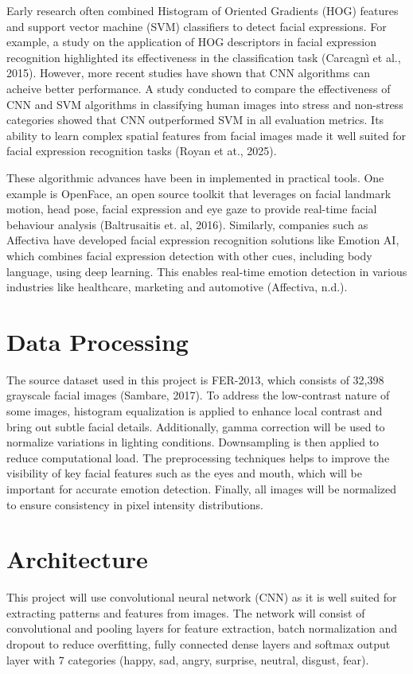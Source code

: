 \documentclass[final]{article}
\begin{document}
Early research often combined Histogram of Oriented Gradients (HOG) features and support vector machine (SVM) classifiers to detect facial expressions. For example, a study on the application of HOG descriptors in facial expression recognition highlighted its effectiveness in the classification task (Carcagnì et al., 2015). However, more recent studies have shown that CNN algorithms can acheive better performance. A study conducted to compare the effectiveness of CNN and SVM algorithms in classifying human images into stress and non-stress categories showed that CNN outperformed SVM in all evaluation metrics. Its ability to learn complex spatial features from facial images made it well suited for facial expression recognition tasks (Royan et at., 2025).

These algorithmic advances have been in implemented in practical tools. One example is OpenFace, an open source toolkit that leverages on facial landmark motion, head pose, facial expression and eye gaze to provide real-time facial behaviour analysis (Baltrusaitis et. al, 2016). Similarly, companies such as Affectiva have developed facial expression recognition solutions like Emotion AI, which combines facial expression detection with other cues, including body language, using deep learning. This enables real-time emotion detection in various industries like healthcare, marketing and automotive (Affectiva, n.d.).


\section*{Data Processing}
The source dataset used in this project is FER-2013, which consists of 32,398 grayscale facial images (Sambare, 2017). To address the low-contrast nature of some images, histogram equalization is applied to enhance local contrast and bring out subtle facial details. Additionally, gamma correction will be used to normalize variations in lighting conditions. Downsampling is then applied to reduce computational load. The preprocessing techniques helps to improve the visibility of key facial features such as the eyes and mouth, which will be important for accurate emotion detection. Finally, all images will be normalized to ensure consistency in pixel intensity distributions.

\section*{Architecture}
This project will use convolutional neural network (CNN) as it is well suited for extracting patterns and features from images. The network will consist of convolutional and pooling layers for feature extraction, batch normalization and dropout to reduce overfitting, fully connected dense layers and softmax output layer with 7 categories (happy, sad, angry, surprise, neutral, disgust, fear).
\end{document}
